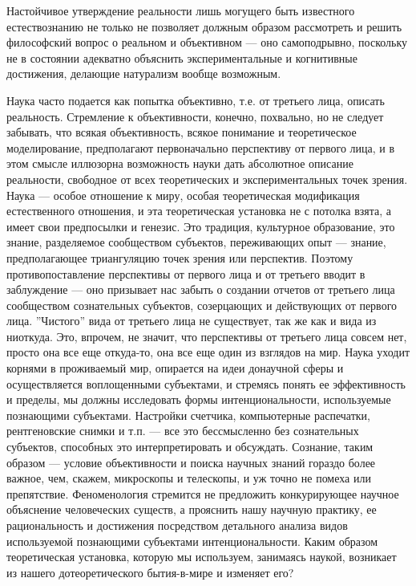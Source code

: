 \documentclass[11pt]{book}
\begin{document}
Настойчивое утверждение реальности лишь могущего быть известного естествознанию не только не позволяет должным образом рассмотреть и решить философский вопрос о реальном и объективном --- оно самоподрывно, поскольку не в состоянии адекватно объяснить экспериментальные и когнитивные достижения, делающие натурализм вообще возможным.

Наука часто подается как попытка объективно, т.е. от третьего лица, описать реальность. Стремление к объективности, конечно, похвально, но не следует забывать, что всякая объективность, всякое понимание и теоретическое моделирование, предполагают первоначально перспективу от первого лица, и в этом смысле иллюзорна возможность науки дать абсолютное описание реальности, свободное от всех теоретических и экспериментальных точек зрения. Наука --- особое отношение к миру, особая теоретическая модификация естественного отношения, и эта теоретическая установка не с потолка взята, а имеет свои предпосылки и генезис. Это традиция, культурное образование, это знание, разделяемое сообществом субъектов, переживающих опыт --- знание, предполагающее триангуляцию точек зрения или перспектив. Поэтому противопоставление перспективы от первого лица и от третьего вводит в заблуждение --- оно призывает нас забыть о создании отчетов от третьего лица сообществом сознательных субъектов, созерцающих и действующих от первого лица. ''Чистого'' вида от третьего лица не существует, так же как и вида из ниоткуда. Это, впрочем, не значит, что перспективы от третьего лица совсем нет, просто она все еще откуда-то, она все еще один из взглядов на мир. Наука уходит корнями в проживаемый мир, опирается на идеи донаучной сферы и осуществляется воплощенными субъектами, и стремясь понять ее эффективность и пределы, мы должны исследовать формы интенциональности, используемые познающими субъектами. Настройки счетчика, компьютерные распечатки, рентгеновские снимки и т.п. --- все это бессмысленно без сознательных субъектов, способных это интерпретировать и обсуждать. Сознание, таким образом --- условие объективности и поиска научных знаний гораздо более важное, чем, скажем, микроскопы и телескопы, и уж точно не помеха или препятствие. Феноменология стремится не предложить конкурирующее научное объяснение человеческих существ, а прояснить нашу научную практику, ее рациональность и достижения посредством детального анализа видов используемой познающими субъектами интенциональности. Каким образом теоретическая установка, которую мы используем, занимаясь наукой, возникает из нашего дотеоретического бытия-в-мире и изменяет его?
\end{document}
